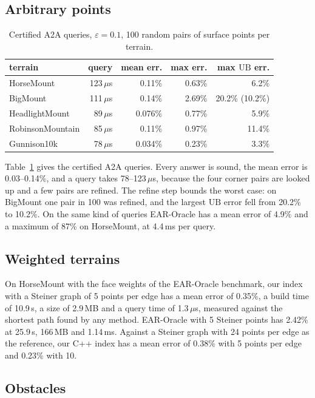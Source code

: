 \documentclass[sigconf,nonacm,screen]{acmart}
\newcommand{\UB}{\mathrm{UB}}
\newcommand{\eps}{\varepsilon}
\begin{document}
\subsection{Arbitrary points}

\begin{table}[t]
\caption{Certified A2A queries, $\eps=0.1$, 100 random pairs of surface points per terrain.}
\label{tab:a2a}
\small
\begin{tabular}{@{}lrrrr@{}}
\toprule
terrain & query & mean err. & max err. & max $\UB$ err.\\
\midrule
HorseMount & 123\,$\mu$s & 0.11\% & 0.63\% & 6.2\%\\
BigMount & 111\,$\mu$s & 0.14\% & 2.69\% & 20.2\% (10.2\%)\\
HeadlightMount & 89\,$\mu$s & 0.076\% & 0.77\% & 5.9\%\\
RobinsonMountain & 85\,$\mu$s & 0.11\% & 0.97\% & 11.4\%\\
Gunnison10k & 78\,$\mu$s & 0.034\% & 0.23\% & 3.3\%\\
\bottomrule
\end{tabular}
\end{table}

Table~\ref{tab:a2a} gives the certified A2A queries. Every answer is sound, the mean error is 0.03--0.14\%,
and a query takes 78--123\,$\mu$s, because the four corner pairs are looked up and a few pairs are refined. The
refine step bounds the worst case: on BigMount one pair in 100 was refined, and the largest $\UB$ error fell from
20.2\% to 10.2\%. On the same kind of queries EAR-Oracle has a mean error of 4.9\% and a maximum of 87\% on
HorseMount, at 4.4\,ms per query.

\subsection{Weighted terrains}

On HorseMount with the face weights of the EAR-Oracle benchmark, our index with a Steiner graph of 5 points per
edge has a mean error of 0.35\%, a build time of 10.9\,s, a size of 2.9\,MB and a query time of 1.3\,$\mu$s,
measured against the shortest path found by any method. EAR-Oracle with 5 Steiner points has 2.42\% at 25.9\,s,
166\,MB and 1.14\,ms. Against a Steiner graph with 24 points per edge as the reference, our C++ index has a mean
error of 0.38\% with 5 points per edge and 0.23\% with 10.

\subsection{Obstacles}
\end{document}
